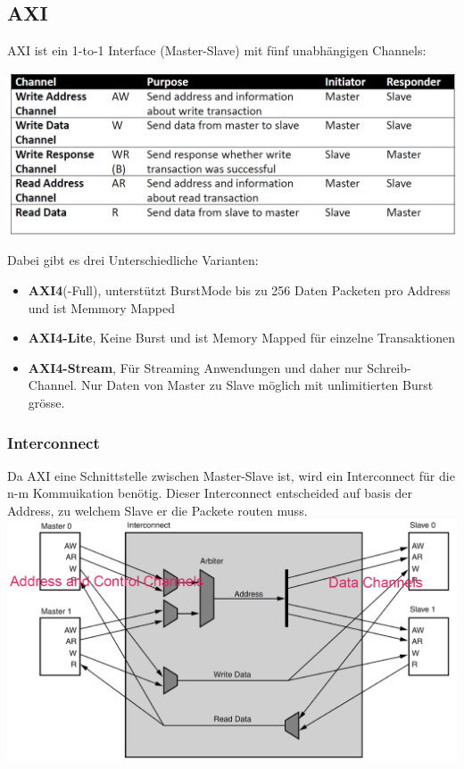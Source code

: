 \subsection{AXI}
AXI ist ein 1-to-1 Interface (Master-Slave) mit fünf unabhängigen Channels:
\begin{center}
	\includegraphics[width=\columnwidth]{Images/axi}
\end{center}

Dabei gibt es drei Unterschiedliche Varianten:
\begin{itemize}
	\item \textbf{AXI4}(-Full), unterstützt BurstMode bis zu 256 Daten Packeten pro Address und ist Memmory Mapped
	\item \textbf{AXI4-Lite}, Keine Burst und ist Memory Mapped für einzelne Transaktionen
	\item \textbf{AXI4-Stream}, Für Streaming Anwendungen und daher nur Schreib-Channel. Nur Daten von Master zu Slave möglich mit unlimitierten Burst grösse.
\end{itemize}

\subsubsection{Interconnect}
Da AXI eine Schnittstelle zwischen Master-Slave ist, wird ein Interconnect für die n-m Kommuikation benötig. Dieser Interconnect entscheided auf basis der Address, zu welchem Slave er die Packete routen muss.
\includegraphics[width=\columnwidth]{Images/interconnect}
